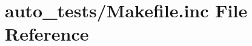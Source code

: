 \hypertarget{auto__tests_2_makefile_8inc}{\section{auto\+\_\+tests/\+Makefile.inc File Reference}
\label{auto__tests_2_makefile_8inc}
}
